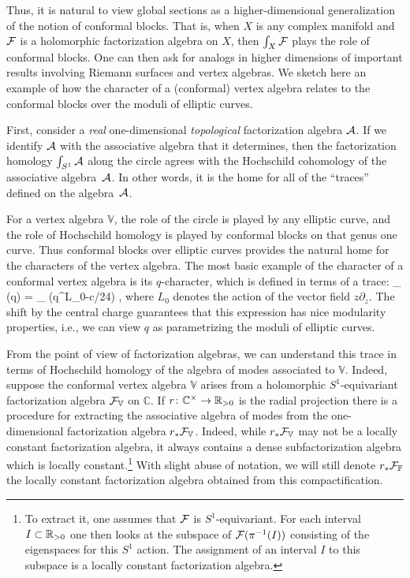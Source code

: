 \documentclass[11pt]{amsart}
\def\del{\partial}
\def\C{{\mathbb{C}}}
\renewcommand{\op}{\operatorname}
\begin{document}
Thus, it is natural to view global sections as a higher-dimensional generalization of the notion of conformal blocks.
That is, when $X$ is any complex manifold and $\mathcal F$ is a holomorphic factorization algebra on $X$, 
then $\int_X \mathcal F$ plays the role of conformal blocks.
One can then ask for analogs in higher dimensions of important results involving Riemann surfaces and vertex algebras.
We sketch here an example of how the character of a (conformal) vertex algebra relates to the conformal blocks over the moduli of elliptic curves.

First, consider a \textit{real} one-dimensional \textit{topological} factorization algebra $\mathcal A$.
If we identify $\mathcal A$ with the associative algebra that it determines, 
then the factorization homology $\int_{S^1} \mathcal A$ along the circle agrees with the Hochschild cohomology of the associative algebra~$\mathcal A$.
In other words, it is the home for all of the ``traces'' defined on the algebra~$\mathcal A$.

For a vertex algebra $\mathbb{V}$, the role of the circle is played by any elliptic curve,
and the role of Hochschild homology is played by conformal blocks on that genus one curve. 
Thus conformal blocks over elliptic curves provides the natural home for the characters of the vertex algebra.
The most basic example of the character of a conformal vertex algebra is its $q$-character,
which is defined in terms of a trace:
\beqn
\op{char}_{} (q) = \op{Tr}_{} (q^{L_0-c/24}) ,
\eeqn
where $L_0$ denotes the action of the vector field $z \del_z$.
The shift by the central charge guarantees that this expression has nice modularity properties, i.e., we can view $q$ as parametrizing the moduli of elliptic curves.

From the point of view of factorization algebras, we can understand this trace in terms of Hochschild homology of the algebra of modes associated to $\mathbb{V}$.
Indeed, suppose the conformal vertex algebra $\mathbb{V}$ arises from a holomorphic $S^1$-equivariant factorization algebra $\mathcal F_{\mathbb{V}}$ on $\C$.
If $r \colon \C^\times \to \RR_{>0}$ is the radial projection there is a procedure for extracting the associative algebra of modes from the one-dimensional factorization algebra $r_* \mathcal F_{\mathbb{V}}$.
Indeed, while $r_* \mathcal F_{\mathbb{V}}$ may not be a locally constant factorization algebra, it always contains a dense subfactorization algebra which is locally constant.\footnote{To extract it, one assumes that $\mathcal F$ is $S^1$-equivariant.
For each interval $I \subset \mathbb R_{>0}$ one then looks at the subspace of $\mathcal F(\pi^{-1}(I))$ consisting of the eigenspaces for this $S^1$ action.
The assignment of an interval $I$ to this subspace is a locally constant factorization algebra.}
With slight abuse of notation, we will still denote $r_* \mathcal F_{\mathbb{F}}$ the locally constant factorization algebra obtained from this compactification.
\end{document}
